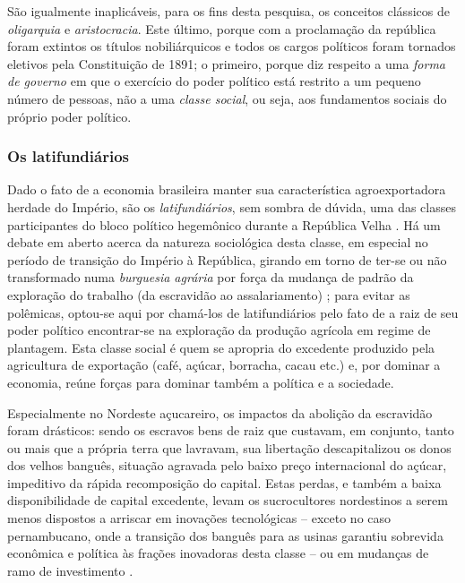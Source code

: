 São igualmente inaplicáveis, para os fins desta pesquisa, os conceitos clássicos de \textit{oligarquia} e \textit{aristocracia}. Este último, porque com a proclamação da república foram extintos os títulos nobiliárquicos e todos os cargos políticos foram tornados eletivos pela Constituição de 1891; o primeiro, porque diz respeito a uma \textit{forma de governo} em que o exercício do poder político está restrito a um pequeno número de pessoas, não a uma \textit{classe social}, ou seja, aos fundamentos sociais do próprio poder político.

\subsubsection{Os latifundiários}\label{subsubsec:clagraris}

Dado o fato de a economia brasileira manter sua característica agroexportadora herdade do Império, são os \textit{latifundiários}, sem sombra de dúvida, uma das classes participantes do bloco político hegemônico durante a República Velha \cite{gorender_burguesia_1990,oliveira_emopro_1977,CARONE1970inst}. Há um debate em aberto acerca da natureza sociológica desta classe, em especial no período de transição do Império à República, girando em torno de ter-se ou não transformado numa \textit{burguesia agrária} por força da mudança de padrão da exploração do trabalho (da escravidão ao assalariamento) \cite{gorender_burguesia_1990,oliveira_emopro_1977}; para evitar as polêmicas, optou-se aqui por chamá-los de latifundiários pelo fato de a raiz de seu poder político encontrar-se na exploração da produção agrícola em regime de plantagem. Esta classe social é quem se apropria do excedente produzido pela agricultura de exportação (café, açúcar, borracha, cacau etc.) e, por dominar a economia, reúne forças para dominar também a política e a sociedade.

Especialmente no Nordeste açucareiro, os impactos da abolição da escravidão foram drásticos: sendo os escravos bens de raiz que custavam, em conjunto, tanto ou mais que a própria terra que lavravam, sua libertação descapitalizou os donos dos velhos banguês, situação agravada pelo baixo preço internacional do açúcar, impeditivo da rápida recomposição do capital. Estas perdas, e também a baixa disponibilidade de capital excedente, levam os sucrocultores nordestinos a serem menos dispostos a arriscar em inovações tecnológicas -- exceto no caso pernambucano, onde a transição dos banguês para as usinas garantiu sobrevida econômica e política às frações inovadoras desta classe -- ou em mudanças de ramo de investimento \cite[p.~153]{CARONE1970inst}. 

